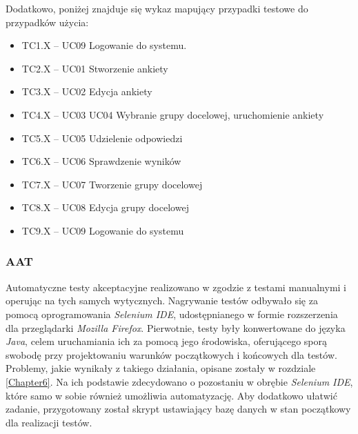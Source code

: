 \matpres
{}
\matsteps
{}
\matremark{}

Dodatkowo, poniżej znajduje się wykaz mapujący przypadki testowe do przypadków użycia:
\begin{itemize}
\item{TC1.X – UC09 Logowanie do systemu.}
\item{TC2.X – UC01 Stworzenie ankiety}
\item{TC3.X – UC02 Edycja ankiety}
\item{TC4.X – UC03 UC04 Wybranie grupy docelowej, uruchomienie ankiety}
\item{TC5.X – UC05 Udzielenie odpowiedzi}
\item{TC6.X – UC06 Sprawdzenie wyników}
\item{TC7.X – UC07 Tworzenie grupy docelowej}
\item{TC8.X – UC08 Edycja grupy docelowej}
\item{TC9.X – UC09 Logowanie do systemu}
\end{itemize}

\subsubsection{AAT}
\label{Chapter7131}

Automatyczne testy akceptacyjne realizowano w zgodzie z testami manualnymi i operując na tych samych wytycznych. Nagrywanie testów odbywało się za pomocą oprogramowania \textit{Selenium IDE}, udostępnianego w formie rozszerzenia dla przeglądarki \textit{Mozilla Firefox}. Pierwotnie, testy były konwertowane do języka \textit{Java}, celem uruchamiania ich za pomocą jego środowiska, oferującego sporą swobodę przy projektowaniu warunków początkowych i końcowych dla testów. Problemy, jakie wynikały z takiego działania, opisane zostały w rozdziale \ref{Chapter6}. Na ich podstawie zdecydowano o pozostaniu w obrębie \textit{Selenium IDE}, które samo w sobie również umożliwia automatyzację. Aby dodatkowo ułatwić zadanie, przygotowany został skrypt ustawiający bazę danych w stan początkowy dla realizacji testów.

